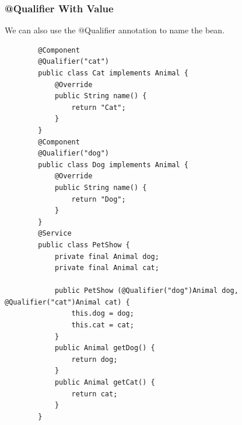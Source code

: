 \documentclass{scrartcl}
\begin{document}
\subsubsection{@Qualifier With Value}
    We can also use the @Qualifier annotation to name the bean.

    \begin{lstlisting}
        @Component
        @Qualifier("cat")
        public class Cat implements Animal {
            @Override
            public String name() {
                return "Cat";
            }
        }
        @Component
        @Qualifier("dog")
        public class Dog implements Animal {
            @Override
            public String name() {
                return "Dog";
            }
        }
        @Service
        public class PetShow {
            private final Animal dog;
            private final Animal cat;

            public PetShow (@Qualifier("dog")Animal dog, @Qualifier("cat")Animal cat) {
                this.dog = dog;
                this.cat = cat;
            }
            public Animal getDog() {
                return dog;
            }
            public Animal getCat() {
                return cat;
            }
        }
        \end{lstlisting}
\end{document}
